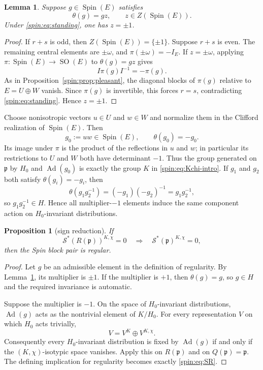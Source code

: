 \documentclass[10pt,a4paper]{amsart}
\numberwithin{equation}{section}
\newtheorem{proposition}[theorem]{Proposition}
\newtheorem{lemma}[theorem]{Lemma}
\newcommand{\Spin}{\operatorname{Spin}}
\newcommand{\SO}{\operatorname{SO}}
\newcommand{\Ad}{\operatorname{Ad}}
\newcommand{\fp}{\mathfrak p}
\newcommand{\cS}{\mathcal S}
\begin{document}
\begin{lemma}\label{spin:lem:central-multipliers}
Suppose $g\in\Spin(E)$ satisfies
\[
  \theta(g)=gz,
  \qquad
  z\in Z(\Spin(E)).
\]
Under \eqref{spin:eq:standing}, one has $z=\pm1$.
\end{lemma}

\begin{proof}
If $r+s$ is odd, then $Z(\Spin(E))=\{\pm1\}$.  Suppose $r+s$ is even.
The remaining central elements are $\pm\omega$, and
$\pi(\pm\omega)=-I_E$.  If $z=\pm\omega$, applying
$\pi:\Spin(E)\to\SO(E)$ to $\theta(g)=gz$ gives
\[
  I\pi(g)I^{-1}=-\pi(g).
\]
As in Proposition~\ref{spin:prop:pleasant}, the diagonal blocks of $\pi(g)$
relative to $E=U\oplus W$ vanish.  Since $\pi(g)$ is invertible, this
forces $r=s$, contradicting \eqref{spin:eq:standing}.  Hence $z=\pm1$.
\end{proof}

Choose nonisotropic vectors $u\in U$ and $w\in W$ and normalize them in the
Clifford realization of $\Spin(E)$.  Then
\begin{equation}\label{spin:eq:g0-minus}
  g_0:=uw\in\Spin(E),
  \qquad
  \theta(g_0)=-g_0.
\end{equation}
Its image under $\pi$ is the product of the reflections in $u$ and $w$; in
particular its restrictions to $U$ and $W$ both have determinant $-1$.  Thus
the group generated on $\fp$ by $H_0$ and $\Ad(g_0)$ is exactly the group
$K$ in \eqref{spin:eq:Kchi-intro}.  If $g_1$ and $g_2$ both satisfy
$\theta(g_i)=-g_i$, then
\[
  \theta(g_1g_2^{-1})=(-g_1)(-g_2)^{-1}=g_1g_2^{-1},
\]
so $g_1g_2^{-1}\in H$.  Hence all multiplier-$-1$ elements induce the same
component action on $H_0$-invariant distributions.

\begin{proposition}[sign reduction]\label{spin:prop:sign-reduction}
If
\begin{equation}\label{spin:eq:SR}
  \cS^*(R(\fp))^{K,\chi}=0
  \quad\Longrightarrow\quad
  \cS^*(\fp)^{K,\chi}=0,
\end{equation}
then the Spin block pair is regular.
\end{proposition}

\begin{proof}
Let $g$ be an admissible element in the definition of regularity.  By
Lemma~\ref{spin:lem:central-multipliers}, its multiplier is $\pm1$.  If the
multiplier is $+1$, then $\theta(g)=g$, so $g\in H$ and the required
invariance is automatic.

Suppose the multiplier is $-1$.  On the space of $H_0$-invariant
distributions, $\Ad(g)$ acts as the nontrivial element of $K/H_0$.  For every
representation $V$ on which $H_0$ acts trivially,
\[
  V=V^K\oplus V^{K,\chi}.
\]
Consequently every $H_0$-invariant distribution is fixed by $\Ad(g)$ if and
only if the $(K,\chi)$-isotypic space vanishes.  Apply this on $R(\fp)$ and on
$Q(\fp)=\fp$.  The defining implication for regularity becomes exactly
\eqref{spin:eq:SR}.
\end{proof}
\end{document}
